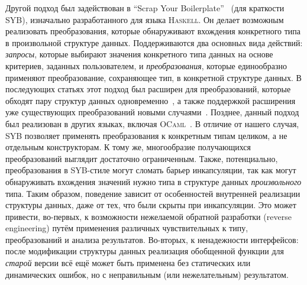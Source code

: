 Другой подход был задействован в ``Scrap Your Boilerplate''~\cite{SYB} (для краткости SYB), изначально разработанного для языка \textsc{Haskell}. Он делает возможным реализовать преобразования,  которые обнаруживают вхождения конкретного типа в произвольной структуре данных. Поддерживаются два основных вида действий: \emph{запросы}, которые выбирают значения конкретного типа данных на основе критериев, заданных пользователем, и \emph{преобразования}, которые единообразно применяют преобразование, сохраняющее тип, в конкретной структуре данных. В последующих статьях этот подход был расширен для преобразований, которые обходят пару структур данных одновременно~\cite{SYB1}, а также поддержкой расширения уже существующих преобразований новыми случаями~\cite{SYB2}. Позднее, данный подход был реализован в других языках, включая \textsc{OCaml}~\cite{SYBOCaml,Staged}. В отличие от нашего случая, SYB позволяет применять преобразования к конкретным типам целиком, а не отдельным конструкторам. К тому же, многообразие получающихся преобразований выглядит достаточно ограниченным. Также, потенциально, преобразования в SYB-стиле могут сломать барьер
инкапсуляции, так как могут обнаруживать вхождения значений нужно типа в структуре данных \emph{произвольного} типа. Таким образом, поведение зависит от особенностей внутренней реализации структуры данных, даже от тех, что были скрыты при инкапсуляции. Это может привести, во-первых, к возможности нежелаемой обратной разработки (reverse engineering) путём применения различных чувствительных к типу, преобразований и анализа результатов. Во-вторых, к ненадежности интерфейсов: после модификации структуры данных реализация обобщенной функции для \emph{старой} версии всё ещё может быть применена без статических или динамических ошибок, но с неправильным (или нежелательным) результатом.

